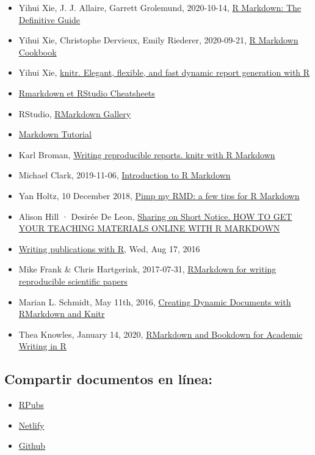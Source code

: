 \documentclass[
]{article}
\providecommand{\tightlist}{%
  \setlength{\itemsep}{0pt}\setlength{\parskip}{0pt}}
\begin{document}
\begin{itemize}
\item
  Yihui Xie, J. J. Allaire, Garrett Grolemund, 2020-10-14,
  \href{https://bookdown.org/yihui/rmarkdown/}{R Markdown: The
  Definitive Guide}
\item
  Yihui Xie, Christophe Dervieux, Emily Riederer, 2020-09-21,
  \href{https://bookdown.org/yihui/rmarkdown-cookbook/}{R Markdown
  Cookbook}
\item
  Yihui Xie, \href{https://yihui.org/knitr/}{knitr. Elegant, flexible,
  and fast dynamic report generation with R}
\item
  \href{https://rstudio.com/resources/cheatsheets/}{Rmarkdown et RStudio
  Cheatsheets}
\item
  RStudio, \href{https://rmarkdown.rstudio.com/gallery.HTML}{RMarkdown
  Gallery}
\item
  \href{https://www.markdowntutorial.com/}{Markdown Tutorial}
\item
  Karl Broman,
  \href{http://kbroman.org/Tools4RR/assets/lectures/03_knitr_Rmd_withnotes.pdf}{Writing
  reproducible reports. knitr with R Markdown}
\item
  Michael Clark, 2019-11-06,
  \href{https://m-clark.github.io/Introduction-to-Rmarkdown/}{Introduction
  to R Markdown}
\item
  Yan Holtz, 10 December 2018,
  \href{https://holtzy.github.io/Pimp-my-rmd/}{Pimp my RMD: a few tips
  for R Markdown}
\item
  Alison Hill · Desirée De Leon,
  \href{https://rstudio-education.github.io/sharing-short-notice/\#1}{Sharing
  on Short Notice. HOW TO GET YOUR TEACHING MATERIALS ONLINE WITH R
  MARKDOWN}
\item
  \href{http://www.geo.uzh.ch/microsite/reproducible_research/post/rr-r-publication/}{Writing
  publications with R}, Wed, Aug 17, 2016
\item
  Mike Frank \& Chris Hartgerink, 2017-07-31,
  \href{https://libscie.github.io/rmarkdown-workshop/handout.html\#headers-tables-and-graphs}{RMarkdown
  for writing reproducible scientific papers}
\item
  Marian L. Schmidt, May 11th, 2016,
  \href{https://rpubs.com/marschmi/RMarkdown}{Creating Dynamic Documents
  with RMarkdown and Knitr}
\item
  Thea Knowles, January 14, 2020,
  \href{https://rpubs.com/thealk/academic-writing}{RMarkdown and
  Bookdown for Academic Writing in R}
\end{itemize}

\hypertarget{compartir-documentos-en-luxednea}{%
\subsection{Compartir documentos en
línea:}\label{compartir-documentos-en-luxednea}}

\begin{itemize}
\tightlist
\item
  \href{https://rpubs.com/}{RPubs}
\item
  \href{https://app.netlify.com/drop}{Netlify}
\item
  \href{https://resources.github.com/whitepapers/github-and-rstudio/}{Github}
\end{itemize}
\end{document}
